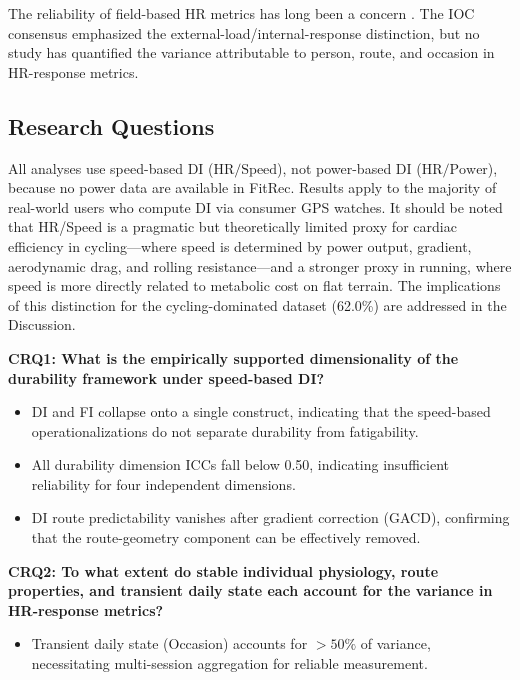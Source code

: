 \documentclass[times, twoside]{zHenriquesLab-StyleBioRxiv}
\begin{document}
The reliability of field-based HR metrics has long been a concern \cite{hopkins2000, halson2014}. The IOC consensus \cite{bourdon2017} emphasized the external-load/internal-response distinction, but no study has quantified the variance attributable to person, route, and occasion in HR-response metrics.

\subsection*{Research Questions}

All analyses use speed-based DI ($\text{HR}/\text{Speed}$), not power-based DI ($\text{HR}/\text{Power}$), because no power data are available in FitRec. Results apply to the majority of real-world users who compute DI via consumer GPS watches. It should be noted that HR/Speed is a pragmatic but theoretically limited proxy for cardiac efficiency in cycling---where speed is determined by power output, gradient, aerodynamic drag, and rolling resistance---and a stronger proxy in running, where speed is more directly related to metabolic cost on flat terrain. The implications of this distinction for the cycling-dominated dataset (62.0\%) are addressed in the Discussion.

\textbf{CRQ1: What is the empirically supported dimensionality of the durability framework under speed-based DI?}
\begin{itemize}
  \item[\textbf{H1}] DI and FI collapse onto a single construct, indicating that the speed-based operationalizations do not separate durability from fatigability.
  \item[\textbf{H2}] All durability dimension ICCs fall below 0.50, indicating insufficient reliability for four independent dimensions.
  \item[\textbf{H3}] DI route predictability vanishes after gradient correction (GACD), confirming that the route-geometry component can be effectively removed.
\end{itemize}

\textbf{CRQ2: To what extent do stable individual physiology, route properties, and transient daily state each account for the variance in HR-response metrics?}
\begin{itemize}
  \item[\textbf{H4}] Transient daily state (Occasion) accounts for $>50\%$ of variance, necessitating multi-session aggregation for reliable measurement.
\end{itemize}
\end{document}
